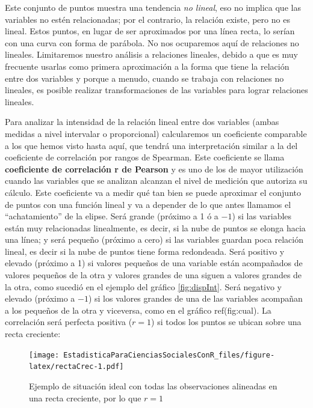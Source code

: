 \documentclass[]{book}
\begin{document}
Este conjunto de puntos muestra una tendencia \emph{no lineal}, eso no
implica que las variables no estén relacionadas; por el contrario, la
relación existe, pero no es lineal. Estos puntos, en lugar de ser
aproximados por una línea recta, lo serían con una curva con forma de
parábola. No nos ocuparemos aquí de relaciones no lineales. Limitaremos
nuestro análisis a relaciones lineales, debido a que es muy frecuente
usarlas como primera aproximación a la forma que tiene la relación entre
dos variables y porque a menudo, cuando se trabaja con relaciones no
lineales, es posible realizar transformaciones de las variables para
lograr relaciones lineales.

Para analizar la intensidad de la relación lineal entre dos variables
(ambas medidas a nivel intervalar o proporcional) calcularemos un
coeficiente comparable a los que hemos visto hasta aquí, que tendrá una
interpretación similar a la del coeficiente de correlación por rangos de
Spearman. Este coeficiente se llama \textbf{coeficiente de correlación r de Pearson} y es uno de los de mayor utilización cuando las variables que
se analizan alcanzan el nivel de medición que autoriza su cálculo. Este
coeficiente va a medir qué tan bien se puede aproximar el conjunto de
puntos con una función lineal y va a depender de lo que antes llamamos
el ``achatamiento'' de la elipse. Será grande (próximo a 1 ó a \(-1\)) si las
variables están muy relacionadas linealmente, es decir, si la nube de
puntos se elonga hacia una línea; y será pequeño (próximo a cero) si las
variables guardan poca relación lineal, es decir si la nube de puntos
tiene forma redondeada. Será positivo y elevado (próximo a 1) si valores
pequeños de una variable están acompañados de valores pequeños de la
otra y valores grandes de una siguen a valores grandes de la otra, como
sucedió en el ejemplo del gráfico \ref{fig:dispInt}. Será negativo y elevado (próximo a
\(-1\)) si los valores grandes de una de las variables acompañan a los
pequeños de la otra y viceversa, como en el gráfico ref(fig:cual). La correlación
será perfecta positiva (\(r = 1\)) si todos los puntos se ubican sobre una recta creciente:

\begin{figure}
\centering
\texttt{[image: EstadisticaParaCienciasSocialesConR\_files/figure-latex/rectaCrec-1.pdf]}
\caption{\label{fig:rectaCrec}Ejemplo de situación ideal con todas las observaciones alineadas en una recta creciente, por lo que \(r = 1\)}
\end{figure}
\end{document}

